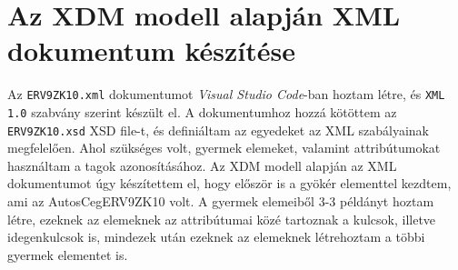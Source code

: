 \documentclass[12pt]{report}
\begin{document}
\section[Az XML dokumentum]{Az XDM modell alapján XML dokumentum készítése}
\indent\indent Az \texttt{ERV9ZK10.xml} dokumentumot \textit{Visual Studio Code}-ban hoztam létre, és \texttt{XML 1.0} szabvány szerint készült el. A dokumentumhoz hozzá kötöttem az \texttt{ERV9ZK10.xsd} XSD file-t, és definiáltam az egyedeket az XML szabályainak megfelelően. Ahol szükséges volt, gyermek elemeket, valamint attribútumokat használtam a tagok azonosításához. Az XDM modell alapján az XML dokumentumot úgy készítettem el, hogy először is a gyökér elementtel kezdtem, ami az AutosCegERV9ZK10 volt. A gyermek elemeiből 3-3 példányt hoztam létre, ezeknek az elemeknek az attribútumai közé tartoznak a kulcsok, illetve idegenkulcsok is, mindezek után ezeknek az elemeknek létrehoztam a többi gyermek elementet is.
\end{document}
